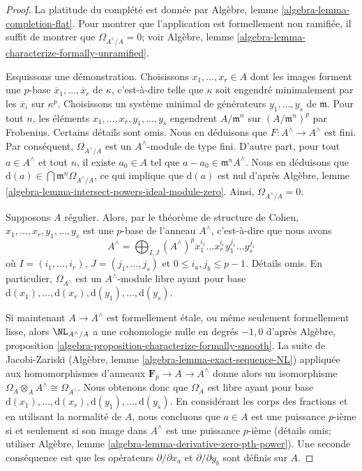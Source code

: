 \begin{proof}
La platitude du complété est donnée par
Algèbre, lemme \ref{algebra-lemma-completion-flat}.
Pour montrer que l'application est formellement non ramifiée, il
suffit de montrer que $\Omega_{A^\wedge/A} = 0$; voir
Algèbre, lemme \ref{algebra-lemma-characterize-formally-unramified}.

\medskip\noindent
Esquissons une démonstration. Choisissons $x_1, \ldots, x_r \in A$ dont les images forment une $p$-base
$\overline{x}_1, \ldots, \overline{x}_r$ de $\kappa$, c'est-à-dire
telle que $\kappa$ soit engendré minimalement par les $\overline{x}_i$ sur $\kappa^p$.
Choisissons un système minimal de générateurs $y_1, \ldots, y_s$ de $\mathfrak m$.
Pour tout $n$, les éléments $x_1, \ldots, x_r, y_1, \ldots, y_s$ engendrent
$A/\mathfrak m^n$ sur $(A/\mathfrak m^n)^p$ par Frobenius.
Certains détails sont omis. Nous en déduisons que $F : A^\wedge \to A^\wedge$
est fini. Par conséquent, $\Omega_{A^\wedge/A}$ est un $A^\wedge$-module de type fini.
D'autre part, pour tout $a \in A^\wedge$ et tout $n$, il existe
$a_0 \in A$ tel que $a - a_0 \in \mathfrak m^nA^\wedge$.
Nous en déduisons que $\text{d}(a) \in \bigcap \mathfrak m^n \Omega_{A^\wedge/A}$,
ce qui implique que $\text{d}(a)$ est nul d'après
Algèbre, lemme \ref{algebra-lemma-intersect-powers-ideal-module-zero}.
Ainsi, $\Omega_{A^\wedge/A} = 0$.

\medskip\noindent
Supposons $A$ régulier. Alors, par le théorème de structure de Cohen,
$x_1, \ldots, x_r, y_1, \ldots, y_s$ est une $p$-base de l'anneau
$A^\wedge$, c'est-à-dire que nous avons
$$
A^\wedge = \bigoplus\nolimits_{I, J} (A^\wedge)^p
x_1^{i_1} \ldots x_r^{i_r} y_1^{j_1} \ldots y_s^{j_s}
$$
où $I = (i_1, \ldots, i_r)$, $J = (j_1, \ldots, j_s)$ et
$0 \leq i_a, j_b \leq p - 1$. Détails omis. En particulier,
$\Omega_{A^\wedge}$ est un $A^\wedge$-module libre ayant pour base
$\text{d}(x_1), \ldots, \text{d}(x_r), \text{d}(y_1), \ldots, \text{d}(y_s)$.

\medskip\noindent
Si maintenant $A \to A^\wedge$ est formellement \'etale, ou même seulement formellement lisse,
alors $\NL_{A^\wedge/A}$ a une cohomologie nulle en degrés $-1, 0$
d'après Algèbre, proposition \ref{algebra-proposition-characterize-formally-smooth}.
La suite de Jacobi-Zariski
(Algèbre, lemme \ref{algebra-lemma-exact-sequence-NL}) appliquée aux homomorphismes d'anneaux
$\mathbf{F}_p \to A \to A^\wedge$ donne alors un isomorphisme
$\Omega_A \otimes_A A^\wedge \cong \Omega_{A^\wedge}$.
Nous obtenons donc que $\Omega_A$ est libre ayant pour base
$\text{d}(x_1), \ldots, \text{d}(x_r), \text{d}(y_1), \ldots, \text{d}(y_s)$.
En considérant les corps des fractions et en utilisant la normalité de $A$,
nous concluons que $a \in A$ est une puissance $p$-ième si et seulement si son image dans
$A^\wedge$ est une puissance $p$-ième (détails omis; utiliser
Algèbre, lemme \ref{algebra-lemma-derivative-zero-pth-power}).
Une seconde conséquence est que les opérateurs $\partial/\partial x_a$ et
$\partial/\partial y_b$ sont définis sur $A$.


\end{proof}

